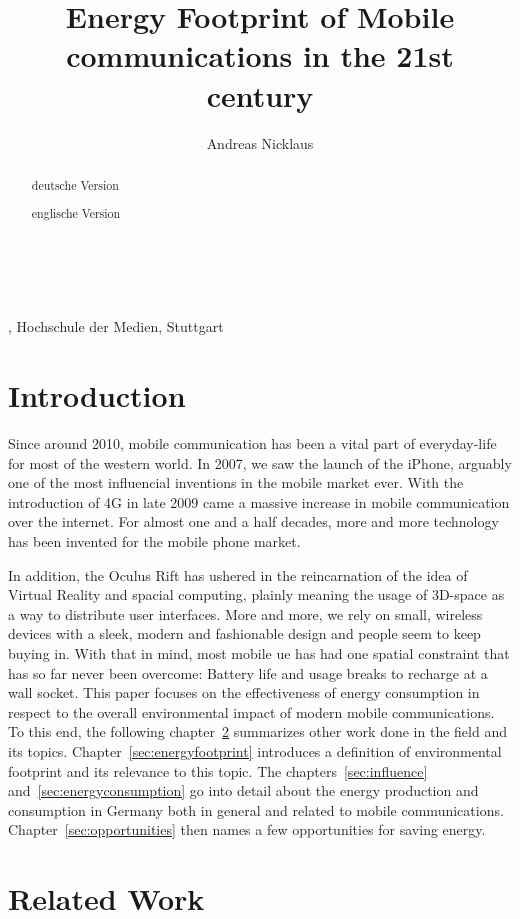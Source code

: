 \documentclass[11pt,a4paper]{article}
\title{Energy Footprint of Mobile communications in the 21st century}
\author{Andreas Nicklaus}
\makeatletter
\renewcommand\maketitle{
{\raggedright
\begin{center}
{\Large \bfseries \@title}\\[2ex] 
\@author\\[1ex] 
\@date, Hochschule der Medien, Stuttgart\\[1ex]
\end{center}}}
\makeatother
\begin{document}
\maketitle

\begin{abstract}
  deutsche Version
\end{abstract}


\begin{abstract}
  englische Version
\end{abstract}

\tableofcontents

\section{Introduction}\label{sec:intro}
Since around 2010, mobile communication has been a vital part of everyday-life for most of the western world.
In 2007, we saw the launch of the iPhone, arguably one of the most influencial inventions in the mobile market ever.
With the introduction of 4G in late 2009 came a massive increase in mobile communication over the internet.
For almost one and a half decades, more and more technology has been invented for the mobile phone market.

In addition, the Oculus Rift has ushered in the reincarnation of the idea of Virtual Reality and spacial computing, plainly meaning the usage of 3D-space as a way to distribute user interfaces.
More and more, we rely on small, wireless devices with a sleek, modern and fashionable design and people seem to keep buying in. 
With that in mind, most mobile \acrshort{ue} has had one spatial constraint that has so far never been overcome: Battery life and usage breaks to recharge at a wall socket.
This paper focuses on the effectiveness of energy consumption in respect to the overall environmental impact of modern mobile communications.
To this end, the following chapter~\ref{sec:relatedwork} summarizes other work done in the field and its topics.
Chapter~\ref{sec:energyfootprint} introduces a definition of environmental footprint and its relevance to this topic.
The chapters~\ref{sec:influence} and~\ref{sec:energyconsumption} go into detail about the energy production and consumption in Germany both in general and related to mobile communications.
Chapter~\ref{sec:opportunities} then names a few opportunities for saving energy.

\section{Related Work}\label{sec:relatedwork}
\end{document}
